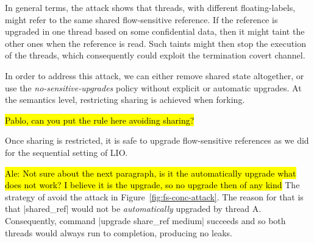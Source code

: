 In general terms, the attack shows that threads, with different floating-labels,
might refer to the same shared flow-sensitive reference. If the reference is
upgraded in one thread based on some confidential data, then it might taint the
other ones when the reference is read. Such taints might then stop the execution
of the threads, which consequently could exploit the termination covert channel.

In order to address this attack, we can either remove shared state altogether,
or use the \emph{no-sensitive-upgrades} policy without explicit or automatic
upgrades. At the semantics level, restricting sharing is achieved when forking.

\hl{Pablo, can you put the rule here avoiding sharing?}

Once sharing is restricted, it is safe to upgrade flow-sensitive references as 
we did for the sequential setting of LIO. 

\hl{Ale: Not sure about the next paragraph, is it the automatically upgrade what 
does not work? I believe it is the upgrade, so no upgrade then of any kind}
The strategy of {\nsu} avoid the attack in Figure~\ref{fig:fs-conc-attack}.  The
reason for that is that |shared_ref| would not be \emph{automatically} upgraded
by thread A. Consequently, command |upgrade share_ref medium| succeeds and so
both threads would always run to completion, producing no leaks.


